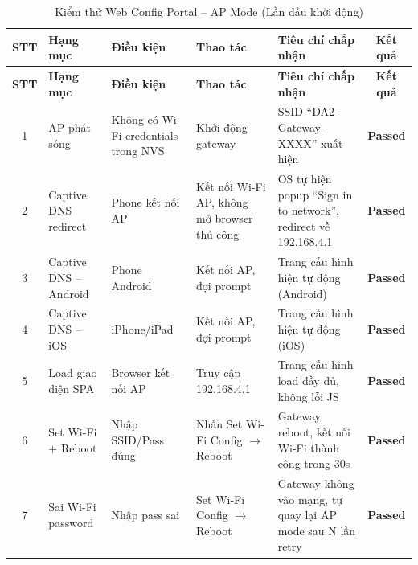         \begin{longtable}{|c|p{2cm}|p{3cm}|p{3cm}|p{4cm}|c|}
            \caption{Kiểm thử Web Config Portal -- AP Mode (Lần đầu khởi động)}
            \label{tab:test_web_config_ap} \\
            \hline
            \textbf{STT} & \textbf{Hạng mục} & \textbf{Điều kiện} & \textbf{Thao tác} & \textbf{Tiêu chí chấp nhận} & \textbf{Kết quả} \\ \hline
            \endfirsthead
            \hline
            \textbf{STT} & \textbf{Hạng mục} & \textbf{Điều kiện} & \textbf{Thao tác} & \textbf{Tiêu chí chấp nhận} & \textbf{Kết quả} \\ \hline
            \endhead
            \hline
            \endfoot
            \endlastfoot
        
            1 & AP phát sóng & Không có Wi-Fi credentials trong NVS & Khởi động gateway & SSID ``DA2-Gateway-XXXX'' xuất hiện & \textcolor{modern_blue}{\textbf{Passed}} \\ \hline
            2 & Captive DNS redirect & Phone kết nối AP & Kết nối Wi-Fi AP, không mở browser thủ công & OS tự hiện popup ``Sign in to network'', redirect về 192.168.4.1 & \textcolor{modern_blue}{\textbf{Passed}} \\ \hline
            3 & Captive DNS -- Android & Phone Android & Kết nối AP, đợi prompt & Trang cấu hình hiện tự động (Android) & \textcolor{modern_blue}{\textbf{Passed}} \\ \hline
            4 & Captive DNS -- iOS & iPhone/iPad & Kết nối AP, đợi prompt & Trang cấu hình hiện tự động (iOS) & \textcolor{modern_blue}{\textbf{Passed}} \\ \hline
            5 & Load giao diện SPA & Browser kết nối AP & Truy cập 192.168.4.1 & Trang cấu hình load đầy đủ, không lỗi JS & \textcolor{modern_blue}{\textbf{Passed}} \\ \hline
            6 & Set Wi-Fi + Reboot & Nhập SSID/Pass đúng & Nhấn Set Wi-Fi Config $\rightarrow$ Reboot & Gateway reboot, kết nối Wi-Fi thành công trong 30s & \textcolor{modern_blue}{\textbf{Passed}} \\ \hline
            7 & Sai Wi-Fi password & Nhập pass sai & Set Wi-Fi Config $\rightarrow$ Reboot & Gateway không vào mạng, tự quay lại AP mode sau N lần retry & \textcolor{modern_blue}{\textbf{Passed}} \\ \hline
        \end{longtable}

